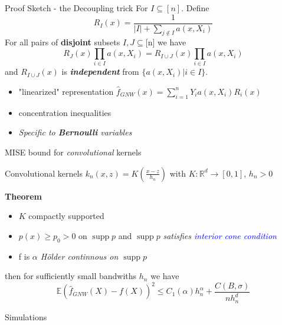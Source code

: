 \documentclass[final,dvipsnames]{beamer}
\makeatletter
\newcommand{\myemph}[1]{\textcolor{blue}{#1}}
\newcommand{\mycolbackwhite}[1]{
\hspace*{.01\linewidth}\begin{minipage}{.96\linewidth}
\begin{mdframed}[backgroundcolor=white!10,linewidth=3pt]
\vspace{10pt}
#1
\vspace{10pt}
\end{mdframed}
\end{minipage}
}
\newcommand*{\rom}[1]{\expandafter\@slowromancap\romannumeral #1@}
\DeclareMathOperator\supp{supp}
\makeatother
\begin{document}
\begin{frame}
\begin{columns}[T]
\begin{column}{0.49\textwidth}
\begin{block}{Proof Sketch - the Decoupling trick
    \hspace*{\fill}{\large{\rom{4}}\qquad}}
   \small For $I\subseteq [n]$. Define %
    \small \begin{equation*}
        R_I(x)=
        \frac{1}{|I|+\sum_{j\notin I}a(x,X_i)}
    \end{equation*}
    \small For all pairs of \textbf{disjoint} subsets $I,J\subseteq$[n] we have
    \begin{equation*}
    R_J(x)\prod_{i\in I}a(x,X_i)=R_{I\cup J}(x)\prod_{i\in I}a(x,X_i)
    \end{equation*}
    \small and $R_{I\cup J}(x)$ is \textbf{\textit{independent}} from $\{a(x,X_i)|i\in I\}$.
    \vspace{20pt}
    \begin{itemize}
        \small \item "linearized" representation 
     $\hat{f}_{GNW}(x)=\sum_{i=1}^nY_ia(x,X_i)R_i(x)$ 
        \small \item concentration inequalities
        \small \item \textit{Specific to \textbf{Bernoulli} variables}
    \end{itemize}
\end{block}
\begin{block}{MISE bound for \textit{convolutional} kernels

    \hspace*{\fill}{\large{\rom{5}}\qquad}}
    Convolutional kernels $k_n(x,z)=K(\frac{x-z}{h_n})$ with $K\colon\mathbb{R}^d\to [0,1]$, $h_n>0$
    \vspace{10pt}
    \mycolbackwhite{\textbf{Theorem}
    \vspace{10pt}
    \begin{itemize}
        \item $K$ compactly supported 
        \item $p(x)\geq p_0>0$ on $\supp{p}$ and $\supp{p}$ \textit{satisfies \myemph{interior cone condition}}
        \item f is \textit{$\alpha$ Hölder continnous on $\supp{p}$}
    \end{itemize}
    then for sufficiently small bandwiths $h_n$ we have
        \begin{equation*}
            \mathbb{E}(\hat{f}_{GNW}(X)-f(X))^2\leq C_1(\alpha)h_n^{\alpha}+\frac{C(B,\sigma)}{nh_n^d}
        \end{equation*}}
\end{block}


\begin{block}{Simulations
    
    \hspace*{\fill}{\large{\rom{6}}\qquad}}
    

\end{block}
\end{column}
\end{columns}
\end{frame}
\end{document}

